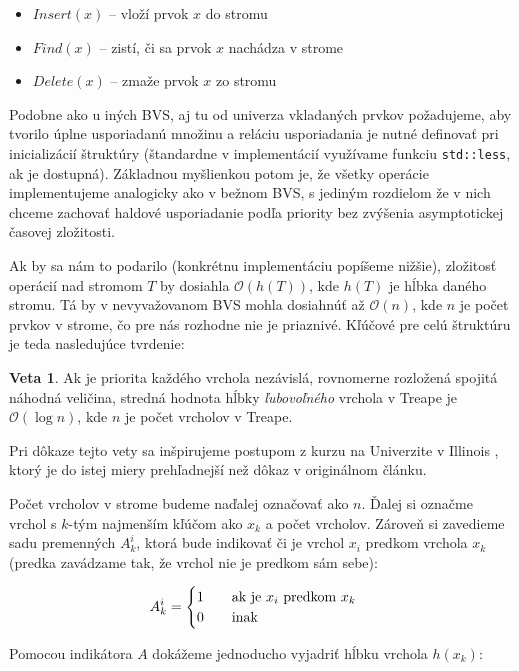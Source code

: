 \documentclass[a4paper, 12pt]{article}
\theoremstyle{definition}
\newtheorem{veta}{Veta}
\begin{document}
\begin{itemize}
    \item $Insert(x)$ -- vloží prvok $x$ do stromu
    \item $Find(x)$ -- zistí, či sa prvok $x$ nachádza v strome
    \item $Delete(x)$ -- zmaže prvok $x$ zo stromu
\end{itemize}

Podobne ako u iných BVS, aj tu od univerza vkladaných prvkov požadujeme, aby
tvorilo úplne usporiadanú množinu a reláciu usporiadania je nutné definovať pri
inicializácií štruktúry (štandardne v implementácií využívame funkciu
\texttt{std::less}, ak je dostupná). Základnou myšlienkou potom je, že všetky
operácie implementujeme analogicky ako v bežnom BVS, s jediným rozdielom
že v nich chceme zachovať haldové usporiadanie podľa priority bez zvýšenia
asymptotickej časovej zložitosti.

Ak by sa nám to podarilo (konkrétnu implementáciu popíšeme nižšie), zložitosť
operácií nad stromom $T$ by dosiahla $\mathcal{O}(h(T))$, kde $h(T)$ je hĺbka
daného stromu. Tá by v nevyvažovanom BVS mohla dosiahnúť až
$\mathcal{O}(n)$,
kde $n$ je počet prvkov v strome, čo pre nás rozhodne nie je priaznivé. Kľúčové
pre celú štruktúru je teda nasledujúce tvrdenie:

\begin{veta}
    Ak je priorita každého vrchola nezávislá, rovnomerne rozložená spojitá
    náhodná veličina, stredná hodnota hĺbky \emph{ľubovoľného} vrchola v Treape
    je $\mathcal{O}(\log n)$, kde $n$ je počet vrcholov v Treape.
\end{veta}

Pri dôkaze tejto vety sa inšpirujeme postupom z kurzu na Univerzite v Illinois
\cite{erickson},
ktorý je do istej miery prehľadnejší než dôkaz v originálnom článku. 

Počet vrcholov v strome budeme naďalej označovať ako $n$. Ďalej si označme
vrchol s $k$-tým najmenším kľúčom ako $x_k$ a počet vrcholov. Zároveň si
zavedieme sadu premenných $A^i_k$, ktorá bude indikovať či je vrchol $x_i$
predkom vrchola $x_k$ (predka zavádzame tak, že vrchol nie je predkom sám
sebe):

$$
A_k^i = 
\begin{cases}
    \text{$1$\qquad ak je $x_i$ predkom $x_k$} \\
    \text{$0$\qquad inak}
\end{cases}
$$

Pomocou indikátora $A$ dokážeme jednoducho vyjadriť hĺbku vrchola $h(x_k)$:
\end{document}
